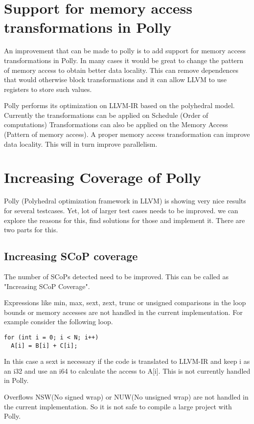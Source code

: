 \label{chap:future}
\section{Support for memory access transformations in Polly}
An improvement that can be made to polly is to add support for memory access transformations in Polly.
In many cases it would be great to change the pattern of memory access to obtain better data locality.
This can remove dependences that would otherwise block transformations and it can allow LLVM to use registers to store such values.

Polly performs its optimization on LLVM-IR based on the polyhedral model. Currently the transformations can be applied on Schedule (Order of computations)
Transformations can also be applied on the Memory Access (Pattern of memory access). A proper memory access transformation can improve data locality. This will in turn improve parallelism.

\section{Increasing Coverage of Polly}

Polly (Polyhedral optimization framework in LLVM) is showing very nice results for
several testcases. Yet, lot of larger test cases needs to be improved. we can explore
the reasons for this, find solutions for those and implement it. There are two parts for this.

\subsection{Increasing SCoP coverage}

The number of SCoPs detected need to be improved. This can be called as "Increasing SCoP Coverage". 

Expressions like min, max, sext, zext, trunc or unsigned comparisons in the loop bounds or memory
accesses are not handled in the current implementation. For example consider the following loop.
{\footnotesize
\begin{lstlisting}
for (int i = 0; i < N; i++)
  A[i] = B[i] + C[i];
\end{lstlisting}
}
In this case a sext is necessary if the code is translated to LLVM-IR and keep i as an i32 and
use an i64 to calculate the access to A[i]. This is  not currently handled in Polly.

Overflows NSW(No signed wrap) or NUW(No unsigned wrap) are not handled in the current implementation. So
it is not safe to compile a large project with Polly.

